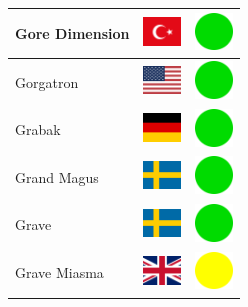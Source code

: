 \documentclass[12pt, a4paper, twoside]{report}
\begin{document}
\begin{center}
\begin{longtable}{|p{5cm}|p{2cm}|p{2cm}|}
Gore Dimension & \includegraphics[width=1cm]{4x3/tr} & \includegraphics[width=1cm]{likes/y} \\ \hline
Gorgatron & \includegraphics[width=1cm]{4x3/us} & \includegraphics[width=1cm]{likes/y} \\ \hline
Grabak & \includegraphics[width=1cm]{4x3/de} & \includegraphics[width=1cm]{likes/y} \\ \hline
Grand Magus & \includegraphics[width=1cm]{4x3/se} & \includegraphics[width=1cm]{likes/y} \\ \hline
Grave & \includegraphics[width=1cm]{4x3/se} & \includegraphics[width=1cm]{likes/y} \\ \hline
Grave Miasma & \includegraphics[width=1cm]{4x3/gb} & \includegraphics[width=1cm]{likes/m} \\ \hline

\end{longtable}
\end{center}
\end{document}
